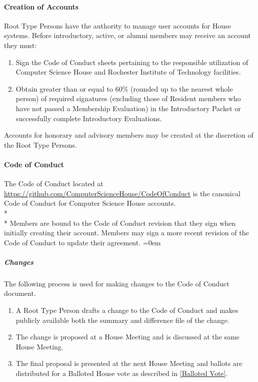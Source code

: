 \documentclass{article}
\newcommand{\asubsubsection}[1]{\paragraph{#1} \label{#1}}
\newcommand{\asubsubsubsection}[1]{\parindent=0em\subparagraph{#1} \label{#1}}
\begin{document}
\asubsubsection{Creation of Accounts}
Root Type Persons have the authority to manage user accounts for House systems.
Before introductory, active, or alumni members may receive an account they must:
\renewcommand{\theenumi}{\alph{enumi}} %
\begin{enumerate}
	\item Sign the Code of Conduct sheets pertaining to the responsible utilization of Computer Science House and Rochester Institute of Technology facilities.
	\item Obtain greater than or equal to 60\% (rounded up to the nearest whole person) of required signatures (excluding those of Resident members who have not passed a Membership Evaluation) in the Introductory Packet or successfully complete Introductory Evaluations.
\end{enumerate}
Accounts for honorary and advisory members may be created at the discretion of the Root Type Persons.

\asubsubsection{Code of Conduct}
The Code of Conduct located at \url{https://github.com/ComputerScienceHouse/CodeOfConduct} is the canonical Code of Conduct for Computer Science House accounts.
\\* \\*
Members are bound to the Code of Conduct revision that they sign when initially creating their account.
Members may sign a more recent revision of the Code of Conduct to update their agreement.
\asubsubsubsection{Changes}
The following process is used for making changes to the Code of Conduct document.
\begin{enumerate}
	\item A Root Type Person drafts a change to the Code of Conduct and makes publicly available both the summary and difference file of the change.
	\item The change is proposed at a House Meeting and is discussed at the same House Meeting.
	\item The final proposal is presented at the next House Meeting and ballots are distributed for a Balloted House vote as described in \ref{Balloted Vote}.
\end{enumerate}
\end{document}
